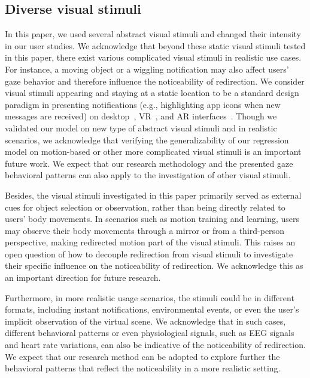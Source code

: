 \subsection{Diverse visual stimuli}
In this paper, we used several abstract visual stimuli and changed their intensity in our user studies.
We acknowledge that beyond these static visual stimuli tested in this paper, there exist various complicated visual stimuli in realistic use cases.
For instance, a moving object or a wiggling notification may also affect users' gaze behavior and therefore influence the noticeability of redirection.
We consider visual stimuli appearing and staying at a static location to be a standard design paradigm in presenting notifications (e.g., highlighting app icons when new messages are received) on desktop~\cite{muller2023notification}, VR~\cite{rzayev2019notification}, and AR interfaces~\cite{lee2023effects}.
Though we validated our model on new type of abstract visual stimuli and in realistic scenarios,
we acknowledge that verifying the generalizability of our regression model on motion-based or other more complicated visual stimuli is an important future work.
We expect that our research methodology and the presented gaze behavioral patterns can also apply to the investigation of other visual stimuli.

Besides, the visual stimuli investigated in this paper primarily served as external cues for object selection or observation, rather than being directly related to users' body movements. 
In scenarios such as motion training and learning, users may observe their body movements through a mirror or from a third-person perspective, making redirected motion part of the visual stimuli. 
This raises an open question of how to decouple redirection from visual stimuli to investigate their specific influence on the noticeability of redirection. 
We acknowledge this as an important direction for future research.

Furthermore, in more realistic usage scenarios, the stimuli could be in different formats, including instant notifications, environmental events, or even the user's implicit observation of the virtual scene.
We acknowledge that in such cases, 
different behavioral patterns or even physiological signals, such as EEG signals and heart rate variations, can also be indicative of the noticeability of redirection.
We expect that our research method can be adopted to explore further the behavioral patterns that reflect the noticeability in a more realistic setting.

